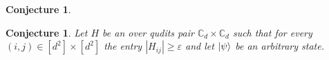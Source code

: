 \documentclass{article}
\newtheorem{lemma}[theorem]{Lemma}
\newtheorem{conjecture}[theorem]{Conjecture}
\begin{document}

\begin{conjecture}

\end{conjecture}

\begin{conjecture}
Let \(H\) be an \Ham over qudits pair \( \mathbb{C}_d \times \mathbb{C}_d \) such that for every \((i,j) \in [d^{2}]\times[d^{2}]\) the entry \( |H_{ij}| \ge \varepsilon \) and let \( \ket{\psi} \) be an arbitrary state.


\end{conjecture}


\printbibliography 
\end{document}

